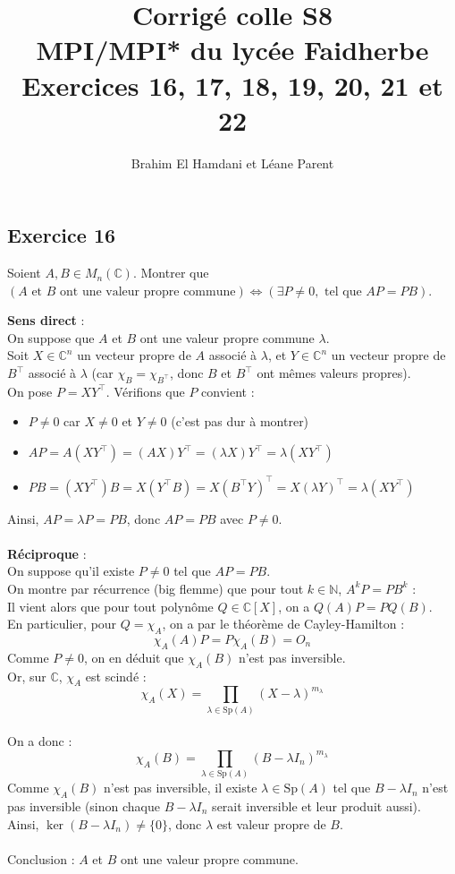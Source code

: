 \documentclass[a4paper,12pt]{article}
\title{Corrigé colle S8 \\
	MPI/MPI* du lycée Faidherbe \\
	\large Exercices 16, 17, 18, 19, 20, 21 et 22}
\author{Brahim El Hamdani et Léane Parent}
\begin{document}
	\maketitle
	
	\subsection*{Exercice 16}
    Soient $A, B \in M_n(\mathbb{C})$.
	Montrer que $(A \text{ et } B \text{ ont une valeur propre commune}) \iff (\exists P \neq 0, \text{ tel que } AP = PB)$.
	
	\begin{correctionbox}
		\textbf{Sens direct} : \\
		On suppose que $A$ et $B$ ont une valeur propre commune $\lambda$. \\
		Soit $X \in \mathbb{C}^n$ un vecteur propre de $A$ associé à $\lambda$, et $Y \in \mathbb{C}^n$ un vecteur propre de $B^\top$ associé à $\lambda$ (car  $\chi_B = \chi_{B^\top}$, donc $B$ et $B^\top$ ont mêmes valeurs propres). \\
		On pose $P = X Y^\top$. Vérifions que $P$ convient :
		\begin{itemize}
			\item $P \neq 0$ car $X \neq 0$ et $Y \neq 0$ (c'est pas dur à montrer)
			\item $AP = A(X Y^\top) = (AX) Y^\top = (\lambda X) Y^\top = \lambda (X Y^\top)$
			\item $PB = (X Y^\top) B = X (Y^\top B) = X (B^\top Y)^\top = X (\lambda Y)^\top = \lambda (X Y^\top)$
		\end{itemize}
		Ainsi, $AP = \lambda P = PB$, donc $AP = PB$ avec $P \neq 0$.	
		\\\\
		\textbf{Réciproque} : \\
		On suppose qu'il existe $P \neq 0$ tel que $AP = PB$. \\ On montre par récurrence (big flemme) que pour tout $k \in \mathbb{N}$, $A^k P = P B^k$ :\\ Il vient alors que pour tout polynôme $Q \in \mathbb{C}[X]$, on a $Q(A)P = P Q(B)$.\\En particulier, pour $Q = \chi_A$, on a par le théorème de Cayley-Hamilton :
		$$\chi_A(A) P = P \chi_A(B) = O_n$$
		Comme $P \neq 0$, on en déduit que $\chi_A(B)$ n'est pas inversible. \\
		
		Or, sur $\mathbb{C}$, $\chi_A$ est scindé :
		$$\chi_A(X) = \prod_{\lambda \in \mathrm{Sp}(A)} (X - \lambda)^{m_\lambda}$$\\
		
		On a donc :
		$$\chi_A(B) = \prod_{\lambda \in \mathrm{Sp}(A)} (B - \lambda I_n)^{m_\lambda}$$
		Comme $\chi_A(B)$ n'est pas inversible, il existe $\lambda \in \mathrm{Sp}(A)$ tel que $B - \lambda I_n$ n'est pas inversible (sinon chaque $B - \lambda I_n$ serait inversible et leur produit aussi). \\ Ainsi, $\ker(B - \lambda I_n) \neq \{0\}$, donc $\lambda$ est valeur propre de $B$. \\\\Conclusion : $A$ et $B$ ont une valeur propre commune.
	\end{correctionbox}
\end{document}
